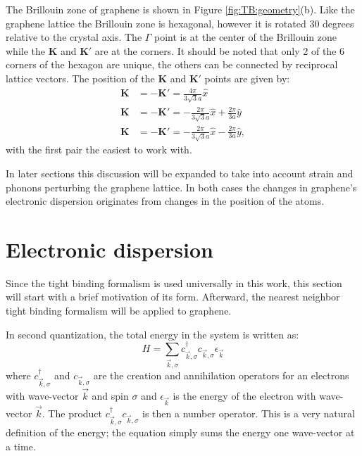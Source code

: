 The Brillouin zone of graphene is shown in Figure \ref{fig:TB:geometry}(b).
Like the graphene lattice the Brillouin zone is hexagonal, however it is rotated 30 degrees relative to the crystal axis.
The $\Gamma$ point is at the center of the Brillouin zone while the $\bm{K}$ and $\bm{K'}$ are at the corners.
It should be noted that only 2 of the 6 corners of the hexagon are unique, the others can be connected by reciprocal lattice vectors.
The position of the $\bm{K}$ and $\bm{K'}$ points are given by:
\begin{align*}
	\bm{K}&=-\bm{K'}= \frac{4 \pi}{3 \sqrt{3} a} \hat{x} \\
	\bm{K}&=-\bm{K'}=-\frac{2 \pi}{3 \sqrt{3} a} \hat{x} + \frac{2 \pi}{3 a} \hat{y} \\
	\bm{K}&=-\bm{K'}=-\frac{2 \pi}{3 \sqrt{3} a} \hat{x} - \frac{2 \pi}{3 a} \hat{y},
\end{align*}
with the first pair the easiest to work with.

In later sections this discussion will be expanded to take into account strain and phonons perturbing the graphene lattice.
In both cases the changes in graphene's electronic dispersion originates from changes in the position of the atoms.

\section{Electronic dispersion}
Since the tight binding formalism is used universally in this work, this section will start with a brief motivation of its form.
Afterward, the nearest neighbor tight binding formalism will be applied to graphene.

In second quantization, the total energy in the system is written as:
\begin{equation*}
	H=\sum_{\vec{k},\sigma} c^{\dagger}_{\vec{k},\sigma} c_{\vec{k},\sigma} \epsilon_{\vec{k}}
\end{equation*}
where $c^{\dagger}_{\vec{k},\sigma}$ and $c_{\vec{k},\sigma}$ are the creation and annihilation operators for an electrons with wave-vector $\vec{k}$ and spin $\sigma$ and $\epsilon_{\vec{k}}$ is the energy of the electron with wave-vector $\vec{k}$.
The product $c^{\dagger}_{\vec{k},\sigma} c_{\vec{k},\sigma}$ is then a number operator.
This is a very natural definition of the energy; the equation simply sums the energy one wave-vector at a time.

